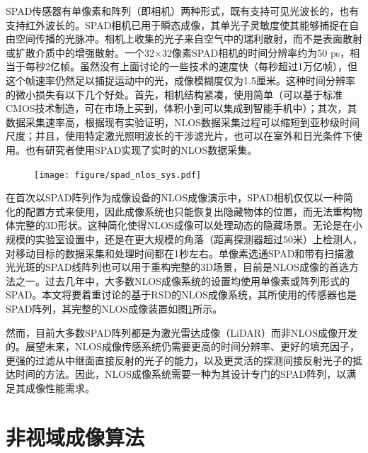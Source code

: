 \documentclass[master]{shtthesis}             %
\begin{document}
SPAD传感器有单像素和阵列（即相机）两种形式，既有支持可见光波长的\citep{richardson200932,richardson2011scaleable,gersbach2012time,bronzi2014100,burri2016linospad}，也有支持红外波长的\citep{itzler2008geiger,itzler2008single,itzler2007single}。SPAD相机已用于瞬态成像，其单光子灵敏度使其能够捕捉在自由空间传播的光脉冲。相机上收集的光子来自空气中的瑞利散射，而不是表面散射或扩散介质中的增强散射\citep{gariepy2015single}。一个32$\times$32像素SPAD相机的时间分辨率约为50 ps，相当于每秒2亿帧。虽然没有上面讨论的一些技术的速度快（每秒超过1万亿帧），但这个帧速率仍然足以捕捉运动中的光，成像模糊度仅为1.5厘米。这种时间分辨率的微小损失有以下几个好处。首先，相机结构紧凑，使用简单（可以基于标准CMOS技术制造，可在市场上买到，体积小到可以集成到智能手机中）；其次，其数据采集速率高，根据现有实验证明，NLOS数据采集过程可以缩短到亚秒级时间尺度\citep{musarra2019non}；并且，使用特定激光照明波长的干涉滤光片，也可以在室外和日光条件下使用\citep{Otoole2018,chan2017non}。也有研究者使用SPAD实现了实时的NLOS数据采集\citep{lindell2018towards}。

\begin{figure}[!tb]
  \centering
  \texttt{[image: figure/spad\_nlos\_sys.pdf]}
  \label{fig:spad_nlos_sys_img}
\end{figure}

在首次以SPAD阵列作为成像设备的NLOS成像演示中，SPAD相机仅仅以一种简化的配置方式来使用，因此成像系统也只能恢复出隐藏物体的位置，而无法重构物体完整的3D形状\citep{chan2017non}。这种简化使得NLOS成像可以处理动态的隐藏场景。无论是在小规模的实验室设置中，还是在更大规模的角落（距离探测器超过50米）上检测人\citep{gariepy2016detection}，对移动目标的数据采集和处理时间都在1秒左右。单像素选通SPAD\citep{buttafava2015non}和带有扫描激光光斑的SPAD线阵列\citep{o2017reconstructing}也可以用于重构完整的3D场景，目前是NLOS成像的首选方法之一。过去几年中，大多数NLOS成像系统的设置均使用单像素或阵列形式的SPAD。本文将要着重讨论的基于RSD的NLOS成像系统，其所使用的传感器也是SPAD阵列，其完整的NLOS成像装置如图\ref{fig:spad_nlos_sys_img}所示。

然而，目前大多数SPAD阵列都是为激光雷达成像（LiDAR）而非NLOS成像开发的。展望未来，NLOS成像传感系统仍需要更高的时间分辨率、更好的填充因子，更强的过滤从中继面直接反射的光子的能力，以及更灵活的探测间接反射光子的抵达时间的方法。因此，NLOS成像系统需要一种为其设计专门的SPAD阵列，以满足其成像性能需求。

\section{非视域成像算法}\label{sec:img_algo}
\end{document}
